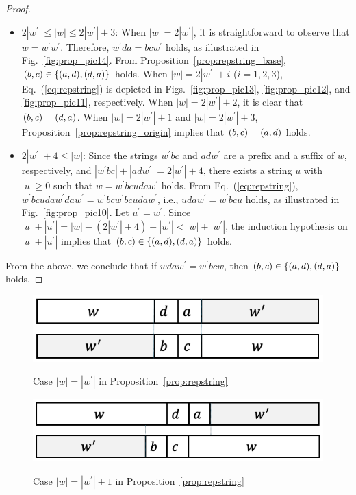 \begin{proof}
\begin{itemize}
%
\item $2|w^{\prime}| \le |w| \le 2|w^{\prime}|+3$:
When $|w|=2|w^{\prime}|$, it is straightforward to observe that $w = w^{\prime}w^{\prime}$.
Therefore, $w^{\prime}da = bcw^{\prime}$ holds, as illustrated in Fig.~\ref{fig:prop_pic14}.
From Proposition~\ref{prop:repstring_base}, $(b,c) \in \{(a,d), (d,a)\}$ holds.
When $|w|=2|w^{\prime}|+i$ ($i=1,2,3$), Eq.~(\ref{eq:repstring}) is depicted in Figs.~\ref{fig:prop_pic13}, \ref{fig:prop_pic12}, and \ref{fig:prop_pic11}, respectively.
When $|w|=2|w^{\prime}|+2$, it is clear that $(b,c) = (d,a)$. 
When $|w|=2|w^{\prime}|+1$ and $|w|=2|w^{\prime}|+3$, Proposition~\ref{prop:repstring_origin} implies that $(b,c) = (a,d)$ holds.
%
\item $2|w^{\prime}|+4 \leq |w|$:
Since the strings $w^{\prime}bc$ and $adw^{\prime}$ are a prefix and a suffix of $w$, respectively, and $|w^{\prime}bc| + |adw^{\prime}| = 2|w^{\prime}| + 4$, there exists a string $u$ with $|u| \geq 0$ such that $w = w^{\prime}bcudaw^{\prime}$ holds.
From Eq.~(\ref{eq:repstring}), $w^{\prime}bcudaw^{\prime}daw^{\prime} = w^{\prime}bcw^{\prime}bcudaw^{\prime}$, i.e., $udaw^{\prime} = w^{\prime}bcu$ holds, as illustrated in Fig.~\ref{fig:prop_pic10}.
Let $u^{\prime} = w^{\prime}$.
Since $|u| + |u^{\prime}| = |w|- (2|w^{\prime}| + 4) + |w^{\prime}| < |w| + |w^{\prime}|$, the induction hypothesis on $|u| + |u^{\prime}|$ implies that $(b,c) \in \{(a,d), (d,a)\}$ holds.
\end{itemize}
From the above, we conclude that if $wdaw^{\prime} = w^{\prime}bcw$, then $(b,c) \in \{(a,d), (d,a)\}$ holds.
\end{proof}

\begin{figure}[t]
\begin{center}
  \includegraphics[scale=0.345]{figs/w=w_1.pdf}
  \caption{Case $|w| = |w^{\prime}|$ in Proposition~\ref{prop:repstring}}\label{fig:prop_pic7}
  \bigskip
  \includegraphics[scale=0.345]{figs/w=w_1+1.pdf}
  \caption{Case $|w| = |w^{\prime}| + 1$ in Proposition~\ref{prop:repstring}}\label{fig:prop_pic8}
\end{center}
\end{figure}

